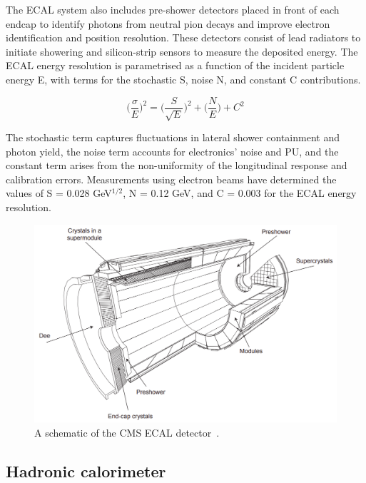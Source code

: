 The \ac{ECAL} system also includes pre-shower detectors placed in front of each endcap to identify photons from neutral pion decays and improve electron identification and position resolution. 
These detectors consist of lead radiators to initiate showering and silicon-strip sensors to measure the deposited energy. 
The \ac{ECAL} energy resolution is parametrised as a function of the incident particle energy E, with terms for the stochastic S, noise N, and constant C contributions.

\begin{equation}
\Big(\frac{\sigma}{E}\Big)^2 = \Big(\frac{S}{\sqrt{E}}\Big)^2 + \Big( \frac{N}{E} \Big) + C^2
\end{equation}

The stochastic term captures fluctuations in lateral shower containment and photon yield, the noise term accounts for electronics' noise and \ac{PU}, and the constant term arises from the non-uniformity of the longitudinal response and calibration errors. 
Measurements using electron beams have determined the values of S = 0.028 GeV$^{1/2}$, N = 0.12 GeV, and C = 0.003 for the \ac{ECAL} energy resolution.

\begin{figure}[!hbtp]
    \centering
    \includegraphics[width=\textwidth]{Figures/ECAL.png}
    \caption{A schematic of the CMS ECAL detector~\cite{CMS_Setup}.}
    \label{fig:ecal}
\end{figure}

\subsection{Hadronic calorimeter}

